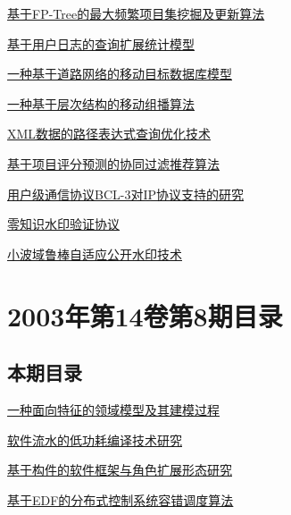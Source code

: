 \documentclass[a4paper]{article}
\begin{document}
\href{http://www.jos.org.cn/ch/reader/download_pdf.aspx?file_no=20030912&year_id=2003&quarter_id=9&falg=1}{基于FP-Tree的最大频繁项目集挖掘及更新算法}

\href{http://www.jos.org.cn/ch/reader/download_pdf.aspx?file_no=20030913&year_id=2003&quarter_id=9&falg=1}{基于用户日志的查询扩展统计模型}

\href{http://www.jos.org.cn/ch/reader/download_pdf.aspx?file_no=20030914&year_id=2003&quarter_id=9&falg=1}{一种基于道路网络的移动目标数据库模型}

\href{http://www.jos.org.cn/ch/reader/download_pdf.aspx?file_no=20030915&year_id=2003&quarter_id=9&falg=1}{一种基于层次结构的移动组播算法}

\href{http://www.jos.org.cn/ch/reader/download_pdf.aspx?file_no=20030916&year_id=2003&quarter_id=9&falg=1}{XML数据的路径表达式查询优化技术}

\href{http://www.jos.org.cn/ch/reader/download_pdf.aspx?file_no=20030917&year_id=2003&quarter_id=9&falg=1}{基于项目评分预测的协同过滤推荐算法}

\href{http://www.jos.org.cn/ch/reader/download_pdf.aspx?file_no=20030918&year_id=2003&quarter_id=9&falg=1}{用户级通信协议BCL-3对IP协议支持的研究}

\href{http://www.jos.org.cn/ch/reader/download_pdf.aspx?file_no=20030920&year_id=2003&quarter_id=9&falg=1}{零知识水印验证协议}

\href{http://www.jos.org.cn/ch/reader/download_pdf.aspx?file_no=20030921&year_id=2003&quarter_id=9&falg=1}{小波域鲁棒自适应公开水印技术}


\section{\textbf{2003年第14卷第8期目录}}
\subsection{本期目录}
\href{http://www.jos.org.cn/ch/reader/download_pdf.aspx?file_no=20030801&year_id=2003&quarter_id=8&falg=1}{一种面向特征的领域模型及其建模过程}

\href{http://www.jos.org.cn/ch/reader/download_pdf.aspx?file_no=20030802&year_id=2003&quarter_id=8&falg=1}{软件流水的低功耗编译技术研究}

\href{http://www.jos.org.cn/ch/reader/download_pdf.aspx?file_no=20030803&year_id=2003&quarter_id=8&falg=1}{基于构件的软件框架与角色扩展形态研究}

\href{http://www.jos.org.cn/ch/reader/download_pdf.aspx?file_no=20030804&year_id=2003&quarter_id=8&falg=1}{基于EDF的分布式控制系统容错调度算法}
\end{document}
